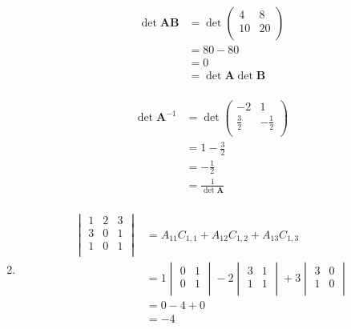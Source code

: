 \documentclass[10pt,oneside,a4paper]{article}
\begin{document}
\begin{enumerate}
\[
\begin{split}
\det{\mathbf{AB}} &= \det{\begin{pmatrix} 4 & 8 \\ 10 & 20 \\ \end{pmatrix}} \\
                  &= 80 - 80 \\
                  &= 0 \\
                  &= \det{\mathbf{A}}\det{\mathbf{B}} \\
\end{split}
\]

\[
\begin{split}
\det{\mathbf{A}^{-1}} &= \det{\begin{pmatrix} -2 & 1 \\ \frac{3}{2} & -\frac{1}{2} \\ \end{pmatrix}} \\
                      &= 1 - \frac{3}{2} \\
                      &= -\frac{1}{2} \\
                      &= \frac{1}{\det{\mathbf{A}}} \\
\end{split}
\]

\item 

\[
\begin{split}
\begin{vmatrix}  1 & 2 & 3 \\ 3 & 0 & 1 \\ 1 & 0 & 1 \\ \end{vmatrix} &= A_{11}C_{1,1} + A_{12}C_{1,2} + A_{13}C_{1,3} \\
                                                                      &= 1 \begin{vmatrix} 0 & 1 \\ 0 & 1 \\ \end{vmatrix} - 2 \begin{vmatrix} 3 & 1 \\ 1 & 1 \\ \end{vmatrix} + 3 \begin{vmatrix} 3 & 0 \\ 1 & 0 \\ \end{vmatrix} \\
                                                                      &= 0 - 4 + 0 \\ 
                                                                      &= -4 \\
\end{split}
\]


\end{enumerate}
\end{document}

